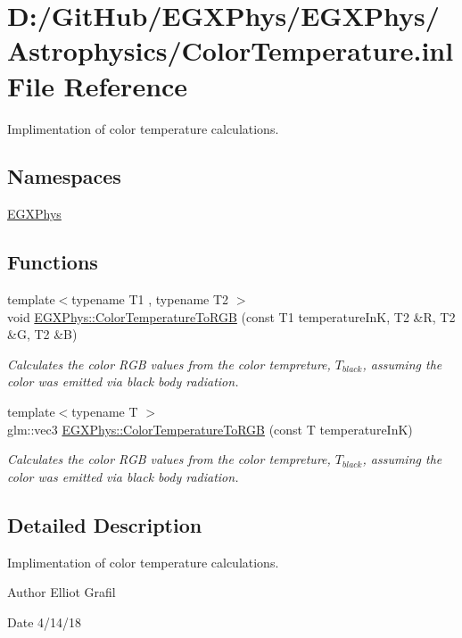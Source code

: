 \hypertarget{_color_temperature_8inl}{}\section{D\+:/\+Git\+Hub/\+E\+G\+X\+Phys/\+E\+G\+X\+Phys/\+Astrophysics/\+Color\+Temperature.inl File Reference}
\label{_color_temperature_8inl}


Implimentation of color temperature calculations.  


\subsection*{Namespaces}
\begin{DoxyCompactItemize}
\item 
 \mbox{\hyperlink{namespace_e_g_x_phys}{E\+G\+X\+Phys}}
\end{DoxyCompactItemize}
\subsection*{Functions}
\begin{DoxyCompactItemize}
\item 
{\footnotesize template$<$typename T1 , typename T2 $>$ }\\void \mbox{\hyperlink{group___e_g_x_phys-_astrophysics-_color_temperature_ga53633ad397d0ee34ff0b5869f41c7c83}{E\+G\+X\+Phys\+::\+Color\+Temperature\+To\+R\+GB}} (const T1 temperature\+InK, T2 \&R, T2 \&G, T2 \&B)
\begin{DoxyCompactList}\small\item\em Calculates the color R\+GB values from the color tempreture, $T_{black}$, assuming the color was emitted via black body radiation. \end{DoxyCompactList}\item 
{\footnotesize template$<$typename T $>$ }\\glm\+::vec3 \mbox{\hyperlink{group___e_g_x_phys-_astrophysics-_color_temperature_gaad787485a232976da96c2c785ce21dad}{E\+G\+X\+Phys\+::\+Color\+Temperature\+To\+R\+GB}} (const T temperature\+InK)
\begin{DoxyCompactList}\small\item\em Calculates the color R\+GB values from the color tempreture, $T_{black}$, assuming the color was emitted via black body radiation. \end{DoxyCompactList}\end{DoxyCompactItemize}


\subsection{Detailed Description}
Implimentation of color temperature calculations. 

\begin{DoxyAuthor}{Author}
Elliot Grafil 
\end{DoxyAuthor}
\begin{DoxyDate}{Date}
4/14/18 
\end{DoxyDate}

